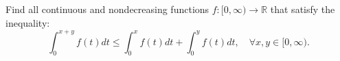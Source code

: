 Find all continuous and nondecreasing functions $ f:[0,\infty)\longrightarrow\mathbb{R} $ that satisfy the inequality:
$$ \int_0^{x+y} f(t) dt\le \int_0^x f(t) dt +\int_0^y f(t) dt,\quad\forall x,y\in [0,\infty) . $$